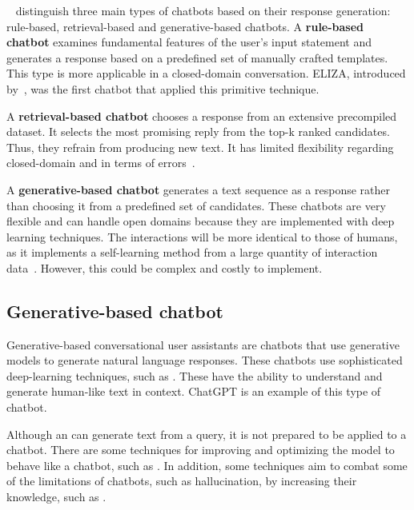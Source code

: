 ~\citet{peng_survey_2019} distinguish three main types of chatbots based on their response generation: rule-based, retrieval-based and generative-based chatbots. A \textbf{rule-based chatbot} examines fundamental features of the user's input statement and generates a response based on a predefined set of manually crafted templates. This type is more applicable in a closed-domain conversation. ELIZA, introduced by~\citet{weizenbaum_elizacomputer_1966}, was the first chatbot that applied this primitive technique.

A \textbf{retrieval-based chatbot} chooses a response from an extensive precompiled dataset. It selects the most promising reply from the top-k ranked candidates. Thus, they refrain from producing new text. It has limited flexibility regarding closed-domain and in terms of errors~\cite{agarwal_review_2020}.

A \textbf{generative-based chatbot} generates a text sequence as a response rather than choosing it from a predefined set of candidates. These chatbots are very flexible and can handle open domains because they are implemented with deep learning techniques. The interactions will be more identical to those of humans, as it implements a self-learning method from a large quantity of interaction data~\cite{peng_survey_2019, agarwal_review_2020}. However, this could be complex and costly to implement.


\subsection{Generative-based chatbot}

Generative-based conversational user assistants are chatbots that use generative models to generate natural language responses. These chatbots use sophisticated deep-learning techniques, such as {\llm}. These have the ability to understand and generate human-like text in context. ChatGPT is an example of this type of chatbot.

Although an {\llm} can generate text from a query, it is not prepared to be applied to a chatbot. There are some techniques for improving and optimizing the model to behave like a chatbot, such as {\rlhf}. In addition, some techniques aim to combat some of the limitations of chatbots, such as hallucination, by increasing their knowledge, such as {\rag}.


       

